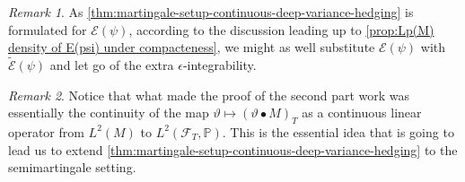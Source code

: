 \documentclass[11pt,a4paper,twoside,openany]{report}
\theoremstyle{plain} %
\theoremstyle{definition} %
\theoremstyle{remark} %
\newtheorem{remark}[remark]{Remark}
\begin{document}
\begin{remark}
    As \cref{thm:martingale-setup-continuous-deep-variance-hedging} is formulated for \(\mathcal{E}(\psi)\), according to the discussion leading up to \cref{prop:Lp(M) density of E(psi) under compacteness}, we might as well substitute \(\mathcal{E}(\psi)\) with \(\widetilde{\mathcal{E}}(\psi)\) and let go of the extra \(\epsilon\)-integrability.
\end{remark}

\begin{remark}\label{rem:sufficient condition for extension}
      Notice that what made the proof of the second part work was essentially the continuity of the map \(\vartheta\mapsto(\vartheta\bullet M)_{T}\) as a continuous linear operator from \(L^2(M)\) to \(L^2(\mathcal{F}_{T},\mathbb{P})\). This is the essential idea that is going to lead us to extend \cref{thm:martingale-setup-continuous-deep-variance-hedging} to the semimartingale setting. 
\end{remark}
 
\end{document}
